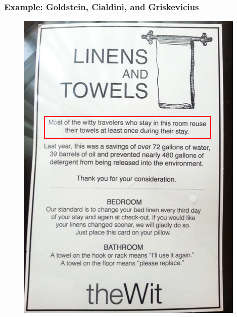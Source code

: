 \documentclass[12pt,english,dvipsnames,aspectratio=169,handout]{beamer}\usepackage[]{graphicx}\usepackage[]{xcolor}
\begin{document}
\begin{frame}
	\frametitle{Example: Goldstein, Cialdini, and Griskevicius \citeyear{goldstein_room_2008}}
    \begin{figure}[ht]
        \begin{minipage}[b]{0.35\linewidth}
            \centering
            \includegraphics[width=\textwidth]{../04-figures/12/09-w12_nudge14}
        \end{minipage}
        \hspace{0.5cm}
        \begin{minipage}[b]{0.4\linewidth}
            \centering

\end{minipage}
\end{figure}
\end{frame}
\end{document}
